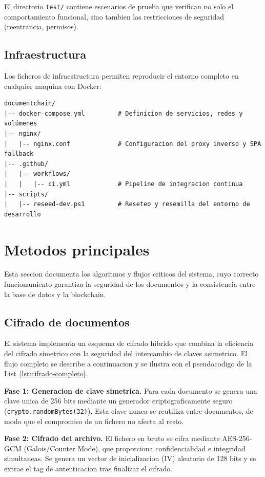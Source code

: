 \documentclass[11pt, a4paper]{article}
\begin{document}
El directorio \texttt{test/} contiene escenarios de prueba que verifican no solo el comportamiento funcional, sino tambien las restricciones de seguridad (reentrancia, permisos).

\subsection{Infraestructura}

Los ficheros de infraestructura permiten reproducir el entorno completo en cualquier maquina con Docker:

\begin{lstlisting}
documentchain/
|-- docker-compose.yml         # Definicion de servicios, redes y volúmenes
|-- nginx/
|   |-- nginx.conf             # Configuracion del proxy inverso y SPA fallback
|-- .github/
|   |-- workflows/
|   |   |-- ci.yml             # Pipeline de integracion continua
|-- scripts/
|   |-- reseed-dev.ps1         # Reseteo y resemilla del entorno de desarrollo
\end{lstlisting}

\section{Metodos principales}

Esta seccion documenta los algoritmos y flujos criticos del sistema, cuyo correcto funcionamiento garantiza la seguridad de los documentos y la consistencia entre la base de datos y la blockchain.

\subsection{Cifrado de documentos}

El sistema implementa un esquema de cifrado hibrido que combina la eficiencia del cifrado simetrico con la seguridad del intercambio de claves asimetrico. El flujo completo se describe a continuacion y se ilustra con el pseudocodigo de la List~\ref{lst:cifrado-completo}.

\textbf{Fase 1: Generacion de clave simetrica.} Para cada documento se genera una clave unica de 256 bits mediante un generador criptograficamente seguro (\texttt{crypto.randomBytes(32)}). Esta clave nunca se reutiliza entre documentos, de modo que el compromiso de un fichero no afecta al resto.

\textbf{Fase 2: Cifrado del archivo.} El fichero en bruto se cifra mediante AES-256-GCM (Galois/Counter Mode), que proporciona confidencialidad e integridad simultaneas. Se genera un vector de inicializacion (IV) aleatorio de 128 bits y se extrae el tag de autenticacion tras finalizar el cifrado.
\end{document}
